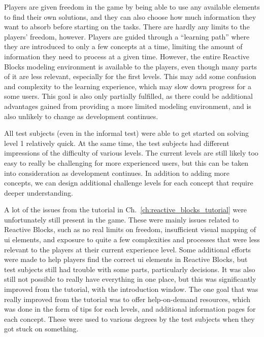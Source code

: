 \noindent
Players are given freedom in the game by being able to use any available elements to find their own solutions, and they can also choose how much information they want to absorb before starting on the tasks. There are hardly any limits to the players' freedom, however. Players are guided through a ``learning path'' where they are introduced to only a few concepts at a time, limiting the amount of information they need to process at a given time. However, the entire Reactive Blocks modeling environment is available to the players, even though many parts of it are less relevant, especially for the first levels. This may add some confusion and complexity to the learning experience, which may slow down progress for a some users. This goal is also only partially fulfilled, as there could be additional advantages gained from providing a more limited modeling environment, and is also unlikely to change as development continues.

\noindent
All test subjects (even in the informal test) were able to get started on solving level 1 relatively quick. At the same time, the test subjects had different impressions of the difficulty of various levels. The current levels are still likely too easy to really be challenging for more experienced users, but this can be taken into consideration as development continues. In addition to adding more concepts, we can design additional challenge levels for each concept that require deeper understanding.

\noindent
A lot of the issues from the tutorial in Ch.~\ref{ch:reactive_blocks_tutorial} were unfortunately still present in the game. These were mainly issues related to Reactive Blocks, such as no real limits on freedom, insufficient visual mapping of \gls{ui} elements, and exposure to quite a few complexities and processes that were less relevant to the players at their current experience level. Some additional efforts were made to help players find the correct \gls{ui} elements in Reactive Blocks, but test subjects still had trouble with some parts, particularly decisions. It was also still not possible to really have everything in one place, but this was significantly improved from the tutorial, with the introduction window. The one goal that was really improved from the tutorial was to offer help-on-demand resources, which was done in the form of tips for each levels, and additional information pages for each concept. These were used to various degrees by the test subjects when they got stuck on something.

